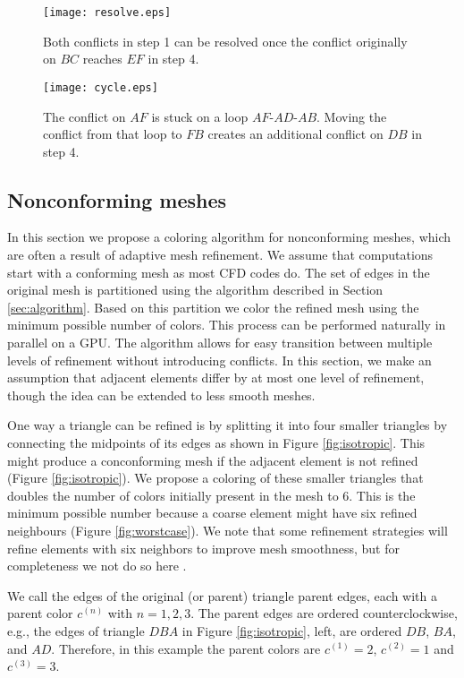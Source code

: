 \documentclass[12pt]{article}
\begin{document}
\begin{figure}
	\centering
	\texttt{[image: resolve.eps]}
	\caption{Both conflicts in step 1 can be resolved once the conflict originally on $BC$ reaches $EF$ in step 4.}
	\label{fig:resolve}
\end{figure}




\begin{figure}
	\centering
	\texttt{[image: cycle.eps]}
	\caption{The conflict on $AF$ is stuck on a loop $AF$-$AD$-$AB$.  Moving the conflict from that loop to $FB$ creates an additional conflict on $DB$ in step 4.}
	\label{fig:cycle}
\end{figure}




\subsection{Nonconforming meshes}
In this section we propose a coloring algorithm for nonconforming meshes, which are often a result of adaptive mesh refinement.  We assume that computations start with a conforming mesh as most CFD codes do.  The set of edges in the original mesh is partitioned using the algorithm described in Section \ref{sec:algorithm}.  Based on this partition we color the refined mesh using the minimum possible number of colors.  This process can be performed naturally in parallel on a GPU.  The algorithm allows for easy transition between multiple levels of refinement without introducing conflicts.  In this section, we make an assumption that adjacent elements differ by at most one level of refinement, though the idea can be extended to less smooth meshes.  

One way a triangle can be refined is by splitting it into four smaller triangles by connecting the midpoints of its edges as shown in Figure \ref{fig:isotropic}.  This might produce a conconforming mesh if the adjacent element is not refined (Figure \ref{fig:isotropic}).  We propose a coloring of these smaller triangles that doubles the number of colors initially present in the mesh to 6.  This is the minimum possible number because a coarse element might have six refined neighbours (Figure \ref{fig:worstcase}).  We note that some refinement strategies will refine elements with six neighbors to improve mesh smoothness, but for completeness we not do so here \cite{dealii}.

We call the edges of the original (or parent) triangle parent edges, each with a parent color $c^{(n)}$ with $n = 1,2,3$.  The parent edges are ordered counterclockwise, e.g., the edges of triangle $DBA$ in Figure \ref{fig:isotropic}, left, are ordered $DB$, $BA$, and $AD$.  Therefore, in this example the parent colors are $c^{(1)} = 2$, $c^{(2)} = 1$ and $c^{(3)} =3$.
\end{document}
